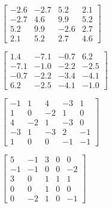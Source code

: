 \begin{exercise}
\begin{Parts}
\begin{reduce}
\item  \(\begin{bmatrix} -2.6 & -2.7 & 5.2 & 2.1
\\ -2.7 & 4.6 & 9.9 & 5.2
\\ 5.2 & 9.9 & -2.6 & 2.7
\\ 2.1 & 5.2 & 2.7 & 4.6
\end{bmatrix}\)
\end{reduce}


\item  \(\begin{bmatrix} 1.4 & -7.1 & -0.7 & 6.2
\\ -7.1 & -1.0 & -2.2 & -2.5
\\ -0.7 & -2.2 & -3.4 & -4.1
\\ 6.2 & -2.5 & -4.1 & -1.0
\end{bmatrix}\)

\item  \(\begin{bmatrix} -1 & 1 & 4 & -3 & 1
\\ 1 & 0 & -2 & 1 & 0
\\ 4 & -2 & 1 & -3 & 0
\\ -3 & 1 & -3 & 2 & -1
\\ 1 & 0 & 0 & -1 & -1
\end{bmatrix}\)

\begin{reduce}
\item  \(\begin{bmatrix} 5 & -1 & 3 & 0 & 0
\\ -1 & -1 & 0 & 0 & -2
\\ 3 & 0 & 1 & 1 & 1
\\ 0 & 0 & 1 & 0 & 0
\\ 0 & -2 & 1 & 0 & -1
\end{bmatrix}\)
\end{reduce}


\end{Parts}
\end{exercise}





